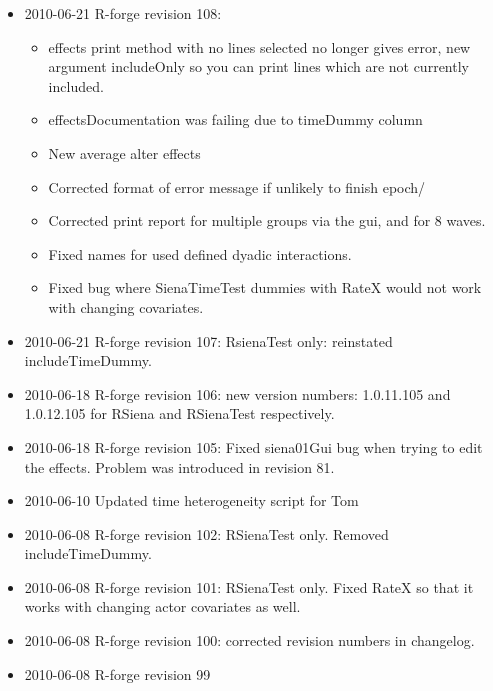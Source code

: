 \documentclass[a4paper,fleqn]{article}
\newcommand{\+}{\, + \,}
\newcommand{\sfn}[1]{\textsf{#1}}
\begin{document}
{\begin{itemize}
\begin{itemize}
\item Removed some inappropriate dyadic covariate effects for bipartite
  networks.
\item Score test output now available via summary() on a fit.
\item Corrected conditional estimation for symmetric networks.
\item Now do not need to specify the variable to condition on if it is the first
  in \sfn{sienaModelCreate()}
\end{itemize}
\item 2010-06-21 R-forge revision 108:
\begin{itemize}
\item effects print method with no lines selected no longer gives error, new
  argument includeOnly so you can print lines which are not currently included.
\item effectsDocumentation was failing due to timeDummy column
\item New average alter effects
\item Corrected format of error message if unlikely to finish epoch/
\item Corrected print report for multiple groups via the gui, and for 8 waves.
\item Fixed names for used defined dyadic interactions.
\item Fixed bug where SienaTimeTest dummies with RateX would not work with
  changing covariates.
\end{itemize}
\item 2010-06-21 R-forge revision 107: RsienaTest only: reinstated
includeTimeDummy.
\item 2010-06-18 R-forge revision 106: new version numbers:
  1.0.11.105 and 1.0.12.105 for RSiena and RSienaTest respectively.
\item 2010-06-18 R-forge revision 105: Fixed siena01Gui bug when trying to edit
  the effects. Problem was introduced in revision 81.
\item 2010-06-10 Updated time heterogeneity script for Tom
\item 2010-06-08 R-forge revision 102: RSienaTest only. Removed
includeTimeDummy.
\item 2010-06-08 R-forge revision 101: RSienaTest only. Fixed RateX so that it
  works with changing actor covariates as well.
\item 2010-06-08 R-forge revision 100: corrected revision numbers in changelog.
\item 2010-06-08 R-forge revision 99

\end{itemize}}
\end{document}
